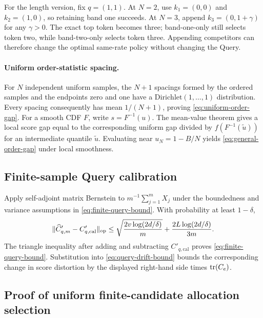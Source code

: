 For the length version, fix $q=(1,1)$.  At $N=2$, use
$k_1=(0,0)$ and $k_2=(1,0)$, so retaining band one succeeds.  At $N=3$,
append $k_3=(0,1+\gamma)$ for any $\gamma>0$.  The exact top token becomes
three; band-one-only still selects token two, while band-two-only selects
token three.  Appending competitors can therefore change the optimal
same-rate policy without changing the Query.

\paragraph{Uniform order-statistic spacing.}
For $N$ independent uniform samples, the $N+1$ spacings formed by the
ordered samples and the endpoints zero and one have a
$\mathrm{Dirichlet}(1,\ldots,1)$ distribution.  Every spacing consequently
has mean $1/(N+1)$, proving \cref{eq:uniform-order-gap}.  For a smooth CDF
$F$, write $s=F^{-1}(u)$.  The mean-value theorem gives a local score gap
equal to the corresponding uniform gap divided by
$f(F^{-1}(\widetilde u))$ for an intermediate quantile
$\widetilde u$.  Evaluating near $u_N=1-B/N$ yields
\cref{eq:general-order-gap} under local smoothness.

\subsection{Finite-sample Query calibration}

Apply self-adjoint matrix Bernstein to
$m^{-1}\sum_{j=1}^mX_j$ under the boundedness and variance assumptions in
\cref{eq:finite-query-bound}.  With probability at least $1-\delta$,
\begin{equation}
 \|\widehat C'_{q,m}-C'_{q,\mathrm{cal}}\|_{\mathrm{op}}
 \le
 \sqrt{\frac{2v\log(2d/\delta)}{m}}
 +\frac{2L\log(2d/\delta)}{3m}.
\end{equation}
The triangle inequality after adding and subtracting
$C'_{q,\mathrm{cal}}$ proves \cref{eq:finite-query-bound}.  Substitution into
\cref{eq:query-drift-bound} bounds the corresponding change in score
distortion by the displayed right-hand side times $\operatorname{tr}(C_e)$.

\subsection{Proof of uniform finite-candidate allocation selection}

